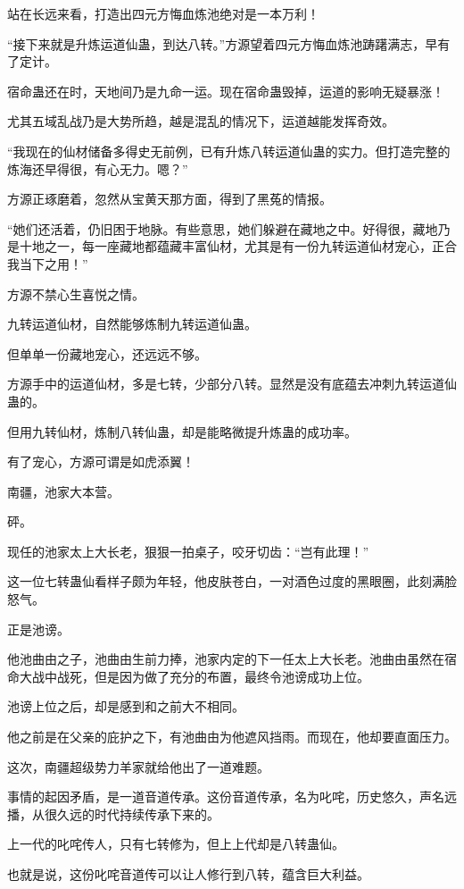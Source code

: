 \begin{this_body}
站在长远来看，打造出四元方悔血炼池绝对是一本万利！

“接下来就是升炼运道仙蛊，到达八转。”方源望着四元方悔血炼池踌躇满志，早有了定计。

宿命蛊还在时，天地间乃是九命一运。现在宿命蛊毁掉，运道的影响无疑暴涨！

尤其五域乱战乃是大势所趋，越是混乱的情况下，运道越能发挥奇效。

“我现在的仙材储备多得史无前例，已有升炼八转运道仙蛊的实力。但打造完整的炼海还早得很，有心无力。嗯？”

方源正琢磨着，忽然从宝黄天那方面，得到了黑菟的情报。

“她们还活着，仍旧困于地脉。有些意思，她们躲避在藏地之中。好得很，藏地乃是十地之一，每一座藏地都蕴藏丰富仙材，尤其是有一份九转运道仙材宠心，正合我当下之用！”

方源不禁心生喜悦之情。

九转运道仙材，自然能够炼制九转运道仙蛊。

但单单一份藏地宠心，还远远不够。

方源手中的运道仙材，多是七转，少部分八转。显然是没有底蕴去冲刺九转运道仙蛊的。

但用九转仙材，炼制八转仙蛊，却是能略微提升炼蛊的成功率。

有了宠心，方源可谓是如虎添翼！

南疆，池家大本营。

砰。

现任的池家太上大长老，狠狠一拍桌子，咬牙切齿：“岂有此理！”

这一位七转蛊仙看样子颇为年轻，他皮肤苍白，一对酒色过度的黑眼圈，此刻满脸怒气。

正是池谤。

他池曲由之子，池曲由生前力捧，池家内定的下一任太上大长老。池曲由虽然在宿命大战中战死，但是因为做了充分的布置，最终令池谤成功上位。

池谤上位之后，却是感到和之前大不相同。

他之前是在父亲的庇护之下，有池曲由为他遮风挡雨。而现在，他却要直面压力。

这次，南疆超级势力羊家就给他出了一道难题。

事情的起因矛盾，是一道音道传承。这份音道传承，名为叱咤，历史悠久，声名远播，从很久远的时代持续传承下来的。

上一代的叱咤传人，只有七转修为，但上上代却是八转蛊仙。

也就是说，这份叱咤音道传可以让人修行到八转，蕴含巨大利益。


\end{this_body}

